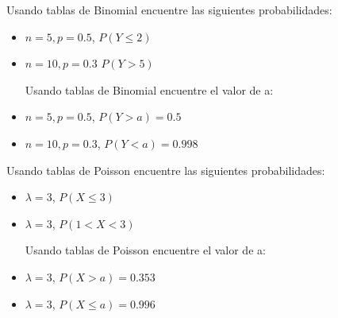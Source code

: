 \documentclass{oxmathproblems}
\begin{document}
\begin{questions}
Usando tablas de Binomial encuentre las siguientes probabilidades:
\begin{itemize}
\item $n = 5, p = 0.5$, $P(Y \leq 2)$
\item $n = 10, p = 0.3$ $P(Y > 5)$

Usando tablas de Binomial encuentre el valor de a:
\item $n = 5, p = 0.5$, $P(Y > a) = 0.5$
\item $n = 10, p = 0.3$, $P(Y < a) = 0.998$
\end{itemize}

Usando tablas de Poisson encuentre las siguientes probabilidades:
\begin{itemize}
\item $\lambda = 3$, $P(X \leq 3)$
\item $\lambda = 3$, $P(1 < X < 3)$

Usando tablas de Poisson encuentre el valor de a:
\item $\lambda = 3$, $P(X > a) = 0.353$
\item $\lambda = 3$, $P(X \leq a) = 0.996$
\end{itemize}


\end{questions}
\end{document}
